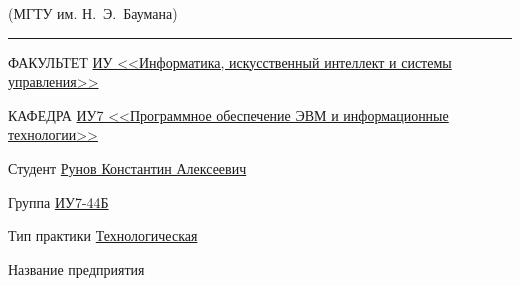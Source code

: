 \begin{titlepage}
\begin{center}
{\begin{minipage}{0.80\textwidth}
{                    {(МГТУ им. Н.~Э.~Баумана)}
                }
            \end{minipage}
        }

        \vspace{0.2cm}
        \rule{\linewidth}{3.4pt}

        \begin{flushleft}
            {ФАКУЛЬТЕТ \uline{ИУ <<Информатика, искусственный интеллект и системы управления>> \hfill}}

            \vspace{0.5cm}

            {КАФЕДРА \uline{ИУ7 <<Программное обеспечение ЭВМ и информационные технологии>> \hfill}}
        \end{flushleft}


        {
            \Large{\textbf{}}

            \vspace{0.5cm}
        }

        \vspace{0.5cm}


        \fontsize{14pt}{14pt}\selectfont

        \begin{flushleft}
            {Студент \uline{Рунов Константин Алексеевич \hfill}}

            \vspace{0.5cm}

            {Группа \uline{ИУ7-44Б \hfill}}

            \vspace{0.5cm}

            {Тип практики \uline{Технологическая \hfill}}

            \vspace{0.5cm}

            {Название предприятия \uline{\hfill}}
        \end{flushleft}


\end{center}
\end{titlepage}
